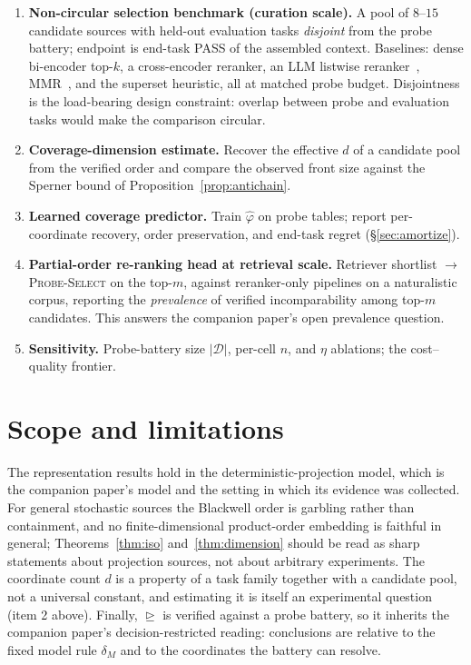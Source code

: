 \documentclass[11pt]{article}
\theoremstyle{plain}
\theoremstyle{definition}
\theoremstyle{remark}
\newcommand{\Dcal}{\mathcal{D}}
\begin{document}
\begin{enumerate}[leftmargin=2em,itemsep=3pt]
  \item \textbf{Non-circular selection benchmark (curation scale).} A pool of $8$--$15$ candidate
    sources with held-out evaluation tasks \emph{disjoint} from the probe battery; endpoint is
    end-task PASS of the assembled context. Baselines: dense bi-encoder top-$k$, a cross-encoder
    reranker, an LLM listwise reranker~\citep{sun2023rankgpt}, MMR~\citep{carbonell1998}, and the
    superset heuristic, all at matched probe budget. Disjointness is the load-bearing design
    constraint: overlap between probe and evaluation tasks would make the comparison circular.
  \item \textbf{Coverage-dimension estimate.} Recover the effective $d$ of a candidate pool from
    the verified order and compare the observed front size against the Sperner bound of
    Proposition~\ref{prop:antichain}.
  \item \textbf{Learned coverage predictor.} Train $\widehat{\varphi}$ on probe tables; report
    per-coordinate recovery, order preservation, and end-task regret (\S\ref{sec:amortize}).
  \item \textbf{Partial-order re-ranking head at retrieval scale.} Retriever shortlist $\to$
    \textsc{Probe-Select} on the top-$m$, against reranker-only pipelines on a naturalistic corpus,
    reporting the \emph{prevalence} of verified incomparability among top-$m$ candidates. This
    answers the companion paper's open prevalence question.
  \item \textbf{Sensitivity.} Probe-battery size $|\Dcal|$, per-cell $n$, and $\eta$ ablations;
    the cost--quality frontier.
\end{enumerate}

\section{Scope and limitations}
\label{sec:limitations}

The representation results hold in the deterministic-projection model, which is the companion
paper's model and the setting in which its evidence was collected. For general stochastic sources
the Blackwell order is garbling rather than containment, and no finite-dimensional product-order
embedding is faithful in general; Theorems~\ref{thm:iso} and~\ref{thm:dimension} should be read as
sharp statements about projection sources, not about arbitrary experiments. The coordinate count
$d$ is a property of a task family together with a candidate pool, not a universal constant, and
estimating it is itself an experimental question (item 2 above). Finally, $\trianglerighteq$ is
verified against a probe battery, so it inherits the companion paper's decision-restricted reading:
conclusions are relative to the fixed model rule $\delta_M$ and to the coordinates the battery can
resolve.
\end{document}
